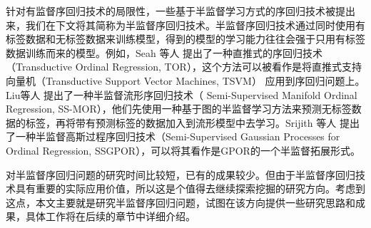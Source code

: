 针对有监督序回归技术的局限性，一些基于半监督学习方式的序回归技术被提出来，我们在下文将其简称为半监督序回归技术。半监督序回归技术通过同时使用有标签数据和无标签数据来训练模型，得到的模型的学习能力往往会强于只用有标签数据训练而来的模型。例如，Seah 等人\citep{seah2012transductive}
提出了一种直推式的序回归技术（Transductive Ordinal Regression, TOR），这个方法可以被看作是将直推式支持向量机（Transductive Support Vector Machines, TSVM\citep{joachims1999transductive}）
应用到序回归问题上。Liu等人\citep{liu2011semi}
提出了一种半监督流形序回归技术（ Semi-Supervised Manifold Ordinal Regression, SS-MOR），他们先使用一种基于图的半监督学习方法来预测无标签数据的标签，再将带有预测标签的数据加入到流形模型中去学习。Srijith 等人\citep{srijith2013semi}
提出了一种半监督高斯过程序回归技术（Semi-Supervised Gaussian Processes for Ordinal Regression, SSGPOR），可以将其看作是GPOR\citep{chu2005gaussian}的一个半监督拓展形式。

对半监督序回归问题的研究时间比较短，已有的成果较少。但由于半监督序回归技术具有重要的实际应用价值，所以这是个值得去继续探索挖掘的研究方向。考虑到这点，本文主要就是研究半监督序回归问题，试图在该方向提供一些研究思路和成果，具体工作将在后续的章节中详细介绍。 


